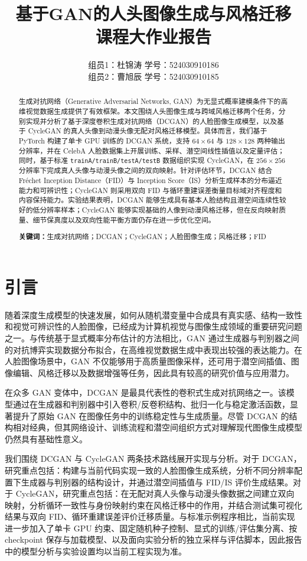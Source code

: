 \documentclass[12pt, a4paper, UTF8]{ctexart}
\title{\bfseries 基于GAN的人头图像生成与风格迁移\\
\large 课程大作业报告}
\author{
    组员1：杜锦涛 \quad 学号：524030910186\\
    组员2：曹旭辰 \quad 学号：524030910185\\
}
\date{}
\begin{document}
\maketitle

\begin{abstract}
生成对抗网络（Generative Adversarial Networks, GAN）为无显式概率建模条件下的高维视觉数据生成提供了有效框架。本文围绕人头图像生成与跨域风格迁移两个任务，分别实现并分析了基于深度卷积生成对抗网络（DCGAN）的人脸图像生成模型，以及基于 CycleGAN 的真人头像到动漫头像无配对风格迁移模型。具体而言，我们基于 PyTorch 构建了单卡 GPU 训练的 DCGAN 系统，支持 $64\times64$ 与 $128\times128$ 两种输出分辨率，并在 CelebA 人脸数据集上开展训练、采样、潜空间线性插值以及定量评估；同时，基于标准 \texttt{trainA/trainB/testA/testB} 数据组织实现 CycleGAN，在 $256\times256$ 分辨率下完成真人头像与动漫头像之间的双向映射。针对评估环节，DCGAN 结合 Fr\'echet Inception Distance（FID）与 Inception Score（IS）分析生成样本的分布逼近能力和可辨识性；CycleGAN 则采用双向 FID 与循环重建误差衡量目标域对齐程度和内容保持能力。实验结果表明，DCGAN 能够生成具有基本人脸结构且潜空间连续性较好的低分辨率样本；CycleGAN 能够实现基础的人像到动漫风格迁移，但在反向映射质量、细节保真度以及双向性能平衡方面仍存在进一步优化空间。

\textbf{关键词：}生成对抗网络；DCGAN；CycleGAN；人脸图像生成；风格迁移；FID
\end{abstract}

\tableofcontents

\section{引言}

随着深度生成模型的快速发展，如何从随机潜变量中合成具有真实感、结构一致性和视觉可辨识性的人脸图像，已经成为计算机视觉与图像生成领域的重要研究问题之一。与传统基于显式概率分布估计的方法相比，GAN 通过生成器与判别器之间的对抗博弈实现数据分布拟合，在高维视觉数据生成中表现出较强的表达能力\cite{goodfellow2014gan}。在人脸图像场景中，GAN 不仅能够用于高质量图像采样，还可用于潜空间插值、图像编辑、风格迁移以及数据增强等任务，因此具有较高的研究价值与应用潜力。

在众多 GAN 变体中，DCGAN 是最具代表性的卷积式生成对抗网络之一\cite{radford2015dcgan}。该模型通过在生成器和判别器中引入卷积/反卷积结构、批归一化与稳定激活函数，显著提升了原始 GAN 在图像任务中的训练稳定性与生成质量。尽管 DCGAN 的结构相对经典，但其网络设计、训练流程和潜空间组织方式对理解现代图像生成模型仍然具有基础性意义。

我们围绕 DCGAN 与 CycleGAN 两条技术路线展开实现与分析。对于 DCGAN，研究重点包括：构建与当前代码实现一致的人脸图像生成系统，分析不同分辨率配置下生成器与判别器的结构设计，并通过潜空间插值与 FID/IS 评价生成结果。对于 CycleGAN，研究重点包括：在无配对真人头像与动漫头像数据之间建立双向映射，分析循环一致性与身份映射约束在风格迁移中的作用，并结合测试集可视化结果与双向 FID、循环重建误差评价迁移质量。与标准示例程序相比，当前实现进一步加入了单卡 GPU 约束、固定随机种子控制、显式的训练/评估集分离、按 checkpoint 保存与加载模型、以及面向实验分析的独立采样与评估脚本，因此报告中的模型分析与实验设置均以当前工程实现为准。
\end{document}
